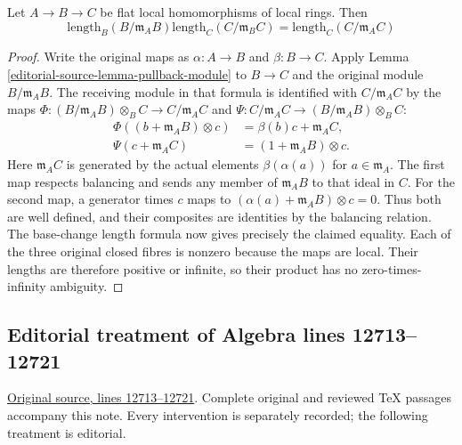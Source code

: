 \begin{lemma}
\label{editorial-source-lemma-pullback-transitive}
Let $A \to B \to C$ be flat local homomorphisms of local rings. Then
$$
\text{length}_B(B/\mathfrak m_A B)
\text{length}_C(C/\mathfrak m_B C)
=
\text{length}_C(C/\mathfrak m_A C)
$$
\end{lemma}

\begin{proof}
Write the original maps as $\alpha:A\to B$ and $\beta:B\to C$.
Apply Lemma \ref{editorial-source-lemma-pullback-module} to $B\to C$ and the
original module $B/\mathfrak m_AB$. The receiving module in
that formula is identified with $C/\mathfrak m_AC$ by the maps
$\Phi:(B/\mathfrak m_AB)\otimes_B C\to C/\mathfrak m_AC$
and $\Psi:C/\mathfrak m_AC\to(B/\mathfrak m_AB)\otimes_B C$:
$$
\begin{aligned}
\Phi((b+\mathfrak m_AB)\otimes c)&=\beta(b)c+\mathfrak m_AC,\\
\Psi(c+\mathfrak m_AC)&=(1+\mathfrak m_AB)\otimes c.
\end{aligned}
$$
Here $\mathfrak m_AC$ is generated by the actual elements
$\beta(\alpha(a))$ for $a\in\mathfrak m_A$.
The first map respects balancing and sends any member of
$\mathfrak m_AB$ to that ideal in $C$.
For the second map, a generator times $c$ maps to
$(\alpha(a)+\mathfrak m_AB)\otimes c=0$.
Thus both are well defined, and their composites are identities
by the balancing relation. The base-change length formula now
gives precisely the claimed equality. Each of the three original
closed fibres is nonzero because the maps are local. Their
lengths are therefore positive or infinite, so their product
has no zero-times-infinity ambiguity.
\end{proof}














\subsection{Editorial treatment of Algebra lines 12713--12721}

\hypertarget{algebra-context-166}{}

\noindent\href{https://github.com/stacks/stacks-project/blob/a04446e57ec1fbc252a871afcec7752fb2807b14/algebra.tex\#L12713}{Original source, lines 12713--12721}. Complete original and reviewed TeX passages accompany this note. Every intervention is separately recorded; the following treatment is editorial.


